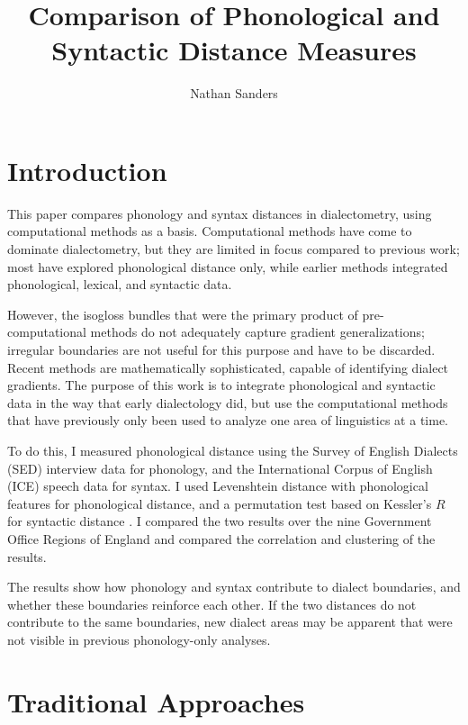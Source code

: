 \documentclass[11pt]{article}
\title{Comparison of Phonological and Syntactic Distance Measures}
\author{Nathan Sanders}
\begin{document}
\maketitle
\doublespacing
\section{Introduction}
This paper compares phonology and syntax distances in dialectometry,
using computational methods as a basis. Computational methods have
come to dominate dialectometry, but they are limited in focus compared
to previous work; most have explored phonological distance only, while
earlier methods integrated phonological, lexical, and syntactic data.

However, the isogloss bundles that were the primary product of
pre-computational methods do not adequately capture gradient
generalizations; irregular boundaries are not useful for this purpose
and have to be discarded. Recent methods are mathematically
sophisticated, capable of identifying dialect gradients. The purpose
of this work is to integrate phonological and syntactic data in the
way that early dialectology did, but use the computational methods
that have previously only been used to analyze one area of linguistics
at a time.

To do this, I measured phonological distance using the Survey of
English Dialects (SED) \cite{orton63} interview data for phonology,
and the International Corpus of English (ICE) \cite{nelson02} speech
data for syntax. I used Levenshtein distance \cite{lev65} with
phonological features \cite{nerbonne97} for phonological distance, and
a permutation test based on Kessler's $R$ \cite{kessler01} for
syntactic distance \cite{nerbonne06}. I compared the two results over
the nine Government Office Regions of England and compared the
correlation and clustering of the results.

The results show how phonology and syntax contribute to dialect
boundaries, and whether these boundaries reinforce each other. If the
two distances do not contribute to the same boundaries, new dialect
areas may be apparent that were not visible in previous phonology-only
analyses.

\section{Traditional Approaches}
\end{document}
